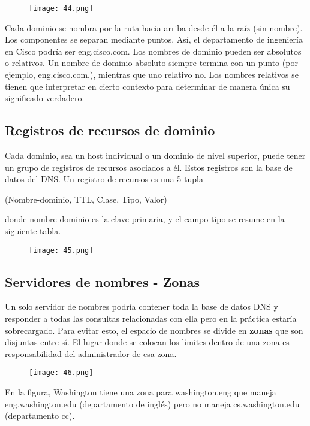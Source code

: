 \documentclass{book}
\begin{document}
	\begin{figure}[H]
		\centering
		\texttt{[image: 44.png]}
	\end{figure}
	
	Cada dominio se nombra por la ruta hacia arriba desde él a la raíz (sin nombre). Los componentes se separan mediante puntos. Así, el departamento de ingeniería en Cisco podría ser eng.cisco.com. Los nombres de dominio pueden ser absolutos o relativos. Un nombre de dominio absoluto siempre termina con un punto (por ejemplo, eng.cisco.com.), mientras que uno relativo no. Los nombres relativos se tienen que interpretar en cierto contexto para determinar de manera única su significado verdadero.
	
	\subsection{Registros de recursos de dominio}
	Cada dominio, sea un host individual o un dominio de nivel superior, puede tener un grupo de registros de recursos asociados a él. Estos registros son la base de datos del DNS. Un registro de recursos es una 5-tupla
	
	\begin{center}
		(Nombre-dominio, TTL, Clase, Tipo, Valor)
	\end{center}
	
	donde nombre-dominio es la clave primaria, y el campo tipo se resume en la siguiente tabla.
	
	\begin{figure}[H]
		\centering
		\texttt{[image: 45.png]}
	\end{figure}
	
	\subsection{Servidores de nombres - Zonas}
	Un solo servidor de nombres podría contener toda la base de datos DNS y responder a todas las consultas relacionadas con ella pero en la práctica estaría sobrecargado. Para evitar esto, el espacio de nombres se divide en \textbf{zonas} que son disjuntas entre sí. El lugar donde se colocan los límites dentro de una zona es responsabilidad del administrador de esa zona.
	
	\begin{figure}[H]
		\centering
		\texttt{[image: 46.png]}
	\end{figure}
	
	En la figura, Washington tiene una zona para washington.eng que maneja eng.washington.edu (departamento de inglés) pero no maneja cs.washington.edu (departamento cc).
	
\end{document}
